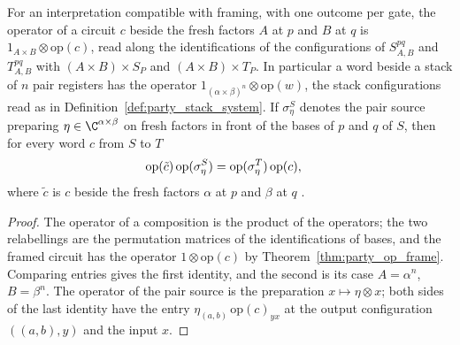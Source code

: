 \begin{theorem}
    \label{thm:party_op_lift_pair}
    \leanok
    For an interpretation compatible with framing, with one outcome per gate, the
    operator of a circuit $c$ beside the fresh factors $A$ at $p$ and $B$ at $q$ is
    $1_{A\times B}\otimes\mathrm{op}(c)$, read along the identifications of the
    configurations of $S^{pq}_{A,B}$ and $T^{pq}_{A,B}$ with $(A\times B)\times S_P$
    and $(A\times B)\times T_P$. In particular a word beside a stack of $n$ pair
    registers has the operator $1_{(\alpha\times\beta)^n}\otimes\mathrm{op}(w)$, the
    stack configurations read as in Definition~\ref{def:party_stack_system}. If
    $\sigma_\eta^S$ denotes the pair source preparing
    $\eta\in\C^{\alpha\times\beta}$ on fresh factors in front of the bases of $p$ and
    $q$ of $S$, then for every word $c$ from $S$ to $T$
    \begin{align}
        \mathrm{op}(\tilde c)\,\mathrm{op}(\sigma_\eta^S)
         & =\mathrm{op}(\sigma_\eta^T)\,\mathrm{op}(c),
        \notag
    \end{align}
    where $\tilde c$ is $c$ beside the fresh factors $\alpha$ at $p$ and $\beta$ at
    $q$ \cite[Section~5]{OpenAI2026PolynomialPEPS}.
\end{theorem}

\begin{proof}\leanok
    The operator of a composition is the product of the operators; the two
    relabellings are the permutation matrices of the identifications of bases, and
    the framed circuit has the operator $1\otimes\mathrm{op}(c)$ by
    Theorem~\ref{thm:party_op_frame}. Comparing entries gives the first identity,
    and the second is its case $A=\alpha^n$, $B=\beta^n$. The operator of the pair
    source is the preparation $x\mapsto\eta\otimes x$; both sides of the last
    identity have the entry $\eta_{(a,b)}\,\mathrm{op}(c)_{yx}$ at the output
    configuration $((a,b),y)$ and the input $x$.
\end{proof}

